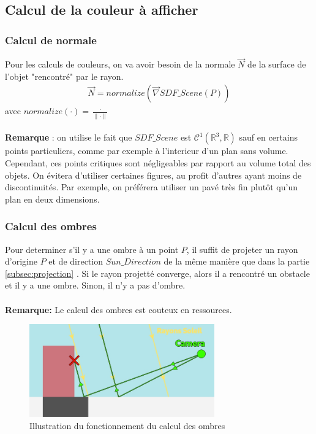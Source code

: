 \newpage
\subsection{Calcul de la couleur à afficher}
\subsubsection{Calcul de normale}
Pour les calculs de couleurs, on va avoir besoin de la normale $\Vec{N}$ de la surface de l'objet "rencontré" par le rayon.
\begin{align*}
    \Vec{N}=normalize(\Vec{\nabla}SDF\_Scene(P))
\end{align*}
avec $normalize(\cdot )=\frac{\cdot }{\|\cdot \|}$\\
\\
\textbf{Remarque} : on utilise le fait que $SDF\_Scene$ est $\mathcal{C}^1(\mathbb{R}^3,\mathbb{R})$ sauf en certains points particuliers, comme par exemple à l'interieur d'un plan sans volume. Cependant, ces points critiques sont négligeables par rapport au volume total des objets. On évitera d'utiliser certaines figures, au profit d'autres ayant moins de discontinuités. Par exemple, on préférera utiliser un pavé très fin plutôt qu'un plan en deux dimensions.

\subsubsection{Calcul des ombres}
Pour determiner s'il y a une ombre à un point $P$, il suffit de projeter un rayon d'origine $P$ et de direction $Sun\_Direction$ de la même manière que dans la partie \ref{subsec:projection} . Si le rayon projetté converge, alors il a rencontré un obstacle et il y a une ombre. Sinon, il n'y a pas d'ombre.\\
\\\textbf{Remarque:} Le calcul des ombres est couteux en ressources.

\begin{figure}[h]
    \centering
    \includegraphics[width=8cm]{images/ombres.jpg}
    \caption{Illustration du fonctionnement du calcul des ombres}
    \label{fig:ombres}
\end{figure}

